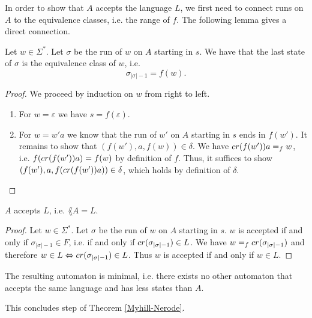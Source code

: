 

In order to show that $A$ accepts the language $L$, we first need to connect runs on $A$ to the equivalence classes, i.e. the range of $f$.
The following lemma gives a direct connection.

\begin{lemma}
    \label{nerode_to_dfa_run}
    Let $w \in \Sigma^*$. Let $\sigma$ be the run of $w$ on $A$ starting in $s$. We have that the last state of $\sigma$ is the equivalence class of $w$, i.e. 
    \begin{equation*}
        \sigma_{|\sigma|-1} = f(w).
    \end{equation*}
\end{lemma}
\begin{proof}
    We proceed by induction on $w$ from right to left.
    \begin{enumerate}
        \item For $w = \varepsilon$ we have $s = f(\varepsilon)$.
        \item For $w = w'a$ we know that the run of $w'$ on $A$ starting in $s$ ends in $f(w')$. 
            It remains to show that $(f(w'), a, f(w)) \in \delta$.
            We have $cr(f(w'))a =_f w$, i.e. $f(cr(f(w'))a) = f(w)$ by definition of $f$.
            Thus, it suffices to show $(f(w'), a, f(cr(f(w'))a)) \in \delta$, which holds by definition of $\delta$.
    \end{enumerate}
\end{proof}

\begin{theorem}
    \label{nerode_to_dfa_correct}
    $A$ accepts $L$, i.e. $\lang{A} = L$.
\end{theorem}
\begin{proof}
    Let $w \in \Sigma^*$. Let $\sigma$ be the run of $w$ on $A$ starting in $s$. 
    $w$ is accepted if and only if $\sigma_{|\sigma|-1} \in F$, i.e. if and only if $cr(\sigma_{|\sigma|-1}) \in L$.
    We have $w =_f cr(\sigma_{|\sigma|-1})$ and therefore $w \in L \Leftrightarrow cr(\sigma_{|\sigma|-1}) \in L$.
    Thus $w$ is accepted if and only if $w \in L$.
\end{proof}

The resulting automaton is minimal, i.e. there exists no other automaton that accepts the same language and has less states than $A$.

This concludes step  of Theorem \ref{Myhill-Nerode}.

